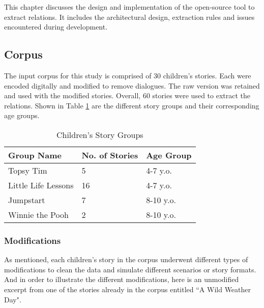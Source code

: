 %
%
%                 

\label{sec:designimplementation}

This chapter discusses the design and implementation of the open-source tool to extract relations. It includes the architectural design, extraction rules and issues encountered during development.

\subsection{Corpus}
\label{sec:corpus}

The input corpus for this study is comprised of 30 children's stories. Each were encoded digitally and modified to remove dialogues. The raw version was retained and used with the modified stories. Overall, 60 stories were used to extract the relations. Shown in Table \ref{tab:stories} are the different story groups and their corresponding age groups. 

\begin{table}[ht]   %
\centering
\caption{Children's Story Groups} \vspace{0.25em}
\begin{tabular}{|p{4cm}|p{2cm}|p{3cm}|} \hline
Group Name & No. of Stories & Age Group \\ \hline
Topsy Tim					& 5 & 4-7 y.o. \\ \hline
Little Life Lessons			& 16 & 4-7 y.o. \\ \hline
Jumpstart					& 7 & 8-10 y.o. \\ \hline
Winnie the Pooh				& 2 & 8-10 y.o. \\ \hline
\end{tabular}
\label{tab:stories}
\end{table}

\subsubsection{Modifications}
\label{sec:modifications}

As mentioned, each children's story in the corpus underwent different types of modifications to clean the data and simulate different scenarios or story formats. And in order to illustrate the different modifications, here is an unmodified excerpt from one of the stories already in the corpus entitled ``A Wild Weather Day".


